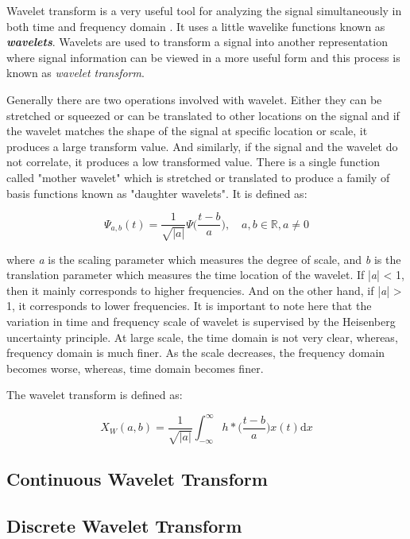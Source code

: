  Wavelet transform is a very useful tool for analyzing the signal simultaneously in both time and frequency domain \cite{addison2017illustrated}. It uses a little wavelike functions known as \textbf{\textit{wavelets}}. Wavelets are used to transform a signal into another representation where signal information can be viewed in a more useful form and this process is known as \textit{wavelet transform}.

Generally there are two operations involved with wavelet. Either they can be stretched or squeezed or can be translated to other locations on the signal and if the wavelet matches the shape of the signal at specific location or scale, it produces a large transform value. And similarly, if the signal and the wavelet do not correlate, it produces a low transformed value. There is a single function called "mother wavelet" which is stretched or translated to produce a family of basis functions known as "daughter wavelets". It is defined as:

\begin{equation} \label{eqn_mother_wavelet}
{\Psi_{a,b}(t) = \frac{1}{\sqrt{|a|}}\Psi \bigg(\frac{t-b}{a}\bigg),\quad a, b \in \mathbb{R}, a \neq 0}
\end{equation}

where \textit{a} is the scaling parameter which measures the degree of scale, and \textit{b} is the translation parameter which measures the time location of the wavelet. If |\textit{a}| < 1, then it mainly corresponds to higher frequencies. And on the other hand, if |\textit{a}| > 1, it corresponds to lower frequencies. It is important to note here that the variation in time and frequency scale of wavelet is supervised by the Heisenberg uncertainty principle. At large scale, the time domain is not very clear, whereas, frequency domain is much finer. As the scale decreases, the frequency domain becomes worse, whereas, time domain becomes finer.

The wavelet transform is defined as:

\begin{equation} \label{eqn_wavelet_transform}
{X_{W}(a, b) = \frac{1}{\sqrt{|a|}} \int_{-\infty}^\infty h*\bigg(\frac{t-b}{a}\bigg)x(t) \mathrm{d}x}
\end{equation}


\subsection{Continuous Wavelet Transform}
\subsection{Discrete Wavelet Transform}

